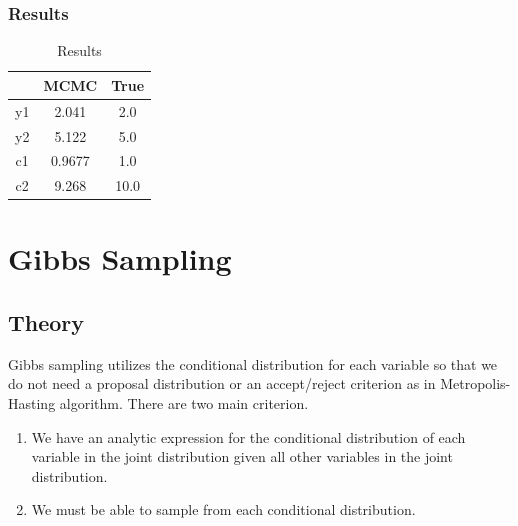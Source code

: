 \documentclass[a4paper,10.5pt,uplatex]{jsarticle}  %
\begin{document}
\subsubsection{Results}
\begin{table}[H]
\centering
\caption{Results}
\label{my-label}
\begin{tabular}{|c|c|c|}
\hline
   & MCMC  & True \\ \hline
y1  & 2.041 & 2.0  \\ \hline
y2  & 5.122 & 5.0  \\ \hline
c1 & 0.9677 & 1.0 \\ \hline
c2 & 9.268 & 10.0 \\ \hline
\end{tabular}
\end{table}


\section{Gibbs Sampling}

\subsection{Theory}
Gibbs sampling utilizes the conditional distribution for each variable so that we do not need a proposal distribution or an accept/reject criterion as in Metropolis-Hasting algorithm. There are two main criterion.
\begin{enumerate}
  \item We have an analytic expression for the conditional distribution of each variable in the joint distribution given all other variables in the joint distribution.
  \item We must be able to sample from each conditional distribution.
\end{enumerate}
\end{document}
